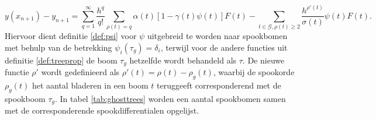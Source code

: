 \documentclass[12pt]{article}
\begin{document}
\begin{equation} \label{eq:ghosterror}
    y(x_{n+1})-y_{n+1}=\sum_{q=1}^\infty\frac{h^q}{q!}\sum_{\rho(t)=q}\alpha(t)[1-\gamma(t)\psi(t)]F(t)-\sum_{t\in\mathcal{G},\rho(t)\ge 2}\frac{h^{\rho'(t)}}{\sigma(t)}\psi(t)F(t).
\end{equation}
Hiervoor dient definitie \ref{def:psi} voor \(\psi\) uitgebreid te worden naar spookbomen met behulp van de betrekking \(\psi_i(\tau_g)=\delta_i\), terwijl voor de andere functies uit definitie \ref{def:treeprop} de boom \(\tau_g\) hetzelfde wordt behandeld als \(\tau\). De nieuwe functie \(\rho'\) wordt gedefinieerd als \(\rho'(t)=\rho(t)-\rho_g(t)\), waarbij de spookorde \(\rho_g(t)\) het aantal bladeren in een boom \(t\) teruggeeft corresponderend met de spookboom \(\tau_g\). In tabel \ref{tab:ghosttrees} worden een aantal spookbomen samen met de corresponderende spookdifferentialen opgelijst.
\end{document}
